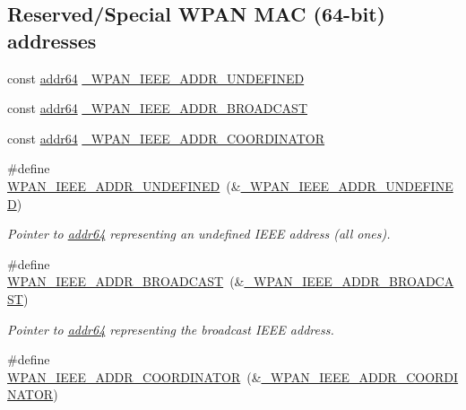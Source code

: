 \subsection*{Reserved/\+Special W\+P\+AN M\+AC (64-\/bit) addresses}
\begin{DoxyCompactItemize}
\item 
const \hyperlink{unionaddr64}{addr64} \hyperlink{group__wpan__types_gaaa2d876b00a2f300e24f1077e17dcb76}{\+\_\+\+W\+P\+A\+N\+\_\+\+I\+E\+E\+E\+\_\+\+A\+D\+D\+R\+\_\+\+U\+N\+D\+E\+F\+I\+N\+ED}
\item 
const \hyperlink{unionaddr64}{addr64} \hyperlink{group__wpan__types_ga83c0da7da25848a435da46b80fb70933}{\+\_\+\+W\+P\+A\+N\+\_\+\+I\+E\+E\+E\+\_\+\+A\+D\+D\+R\+\_\+\+B\+R\+O\+A\+D\+C\+A\+ST}
\item 
const \hyperlink{unionaddr64}{addr64} \hyperlink{group__wpan__types_gac6bb0830c58428d2789507a23ab9fcdd}{\+\_\+\+W\+P\+A\+N\+\_\+\+I\+E\+E\+E\+\_\+\+A\+D\+D\+R\+\_\+\+C\+O\+O\+R\+D\+I\+N\+A\+T\+OR}
\item 
\#define \hyperlink{group__wpan__types_ga09e965ef6cfbfd48312d86bb011f125b}{W\+P\+A\+N\+\_\+\+I\+E\+E\+E\+\_\+\+A\+D\+D\+R\+\_\+\+U\+N\+D\+E\+F\+I\+N\+ED}~(\&\hyperlink{group__wpan__types_gaaa2d876b00a2f300e24f1077e17dcb76}{\+\_\+\+W\+P\+A\+N\+\_\+\+I\+E\+E\+E\+\_\+\+A\+D\+D\+R\+\_\+\+U\+N\+D\+E\+F\+I\+N\+ED})
\begin{DoxyCompactList}\small\item\em Pointer to {\ttfamily \hyperlink{unionaddr64}{addr64}} representing an undefined I\+E\+EE address (all ones). \end{DoxyCompactList}\item 
\mbox{\label{group__wpan__types_gaced36f5538c5bb2da4f60a90313f1674}} 
\#define \hyperlink{group__wpan__types_gaced36f5538c5bb2da4f60a90313f1674}{W\+P\+A\+N\+\_\+\+I\+E\+E\+E\+\_\+\+A\+D\+D\+R\+\_\+\+B\+R\+O\+A\+D\+C\+A\+ST}~(\&\hyperlink{group__wpan__types_ga83c0da7da25848a435da46b80fb70933}{\+\_\+\+W\+P\+A\+N\+\_\+\+I\+E\+E\+E\+\_\+\+A\+D\+D\+R\+\_\+\+B\+R\+O\+A\+D\+C\+A\+ST})
\begin{DoxyCompactList}\small\item\em Pointer to {\ttfamily \hyperlink{unionaddr64}{addr64}} representing the broadcast I\+E\+EE address. \end{DoxyCompactList}\item 
\#define \hyperlink{group__wpan__types_ga816199ef85ef801e07ae48350664034d}{W\+P\+A\+N\+\_\+\+I\+E\+E\+E\+\_\+\+A\+D\+D\+R\+\_\+\+C\+O\+O\+R\+D\+I\+N\+A\+T\+OR}~(\&\hyperlink{group__wpan__types_gac6bb0830c58428d2789507a23ab9fcdd}{\+\_\+\+W\+P\+A\+N\+\_\+\+I\+E\+E\+E\+\_\+\+A\+D\+D\+R\+\_\+\+C\+O\+O\+R\+D\+I\+N\+A\+T\+OR})

\end{DoxyCompactItemize}
